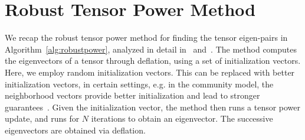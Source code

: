\section{Robust Tensor Power Method}
We recap the robust tensor power method for finding the tensor eigen-pairs in Algorithm~\ref{alg:robustpower}, analyzed in detail in~\cite{AnandkumarEtal:community12} and~\cite{AnandkumarEtal:tensor12}.
The method computes the eigenvectors of a   tensor through deflation, using a set of initialization vectors. Here, we employ random initialization vectors. This can be replaced with better initialization vectors, in certain settings, e.g. in the community model, the neighborhood vectors provide better initialization and lead to stronger guarantees~\cite{AnandkumarEtal:community12}.
Given the initialization vector, the method then runs a tensor power update, and runs for $N$ iterations to obtain an eigenvector. The successive eigenvectors are obtained via deflation.

